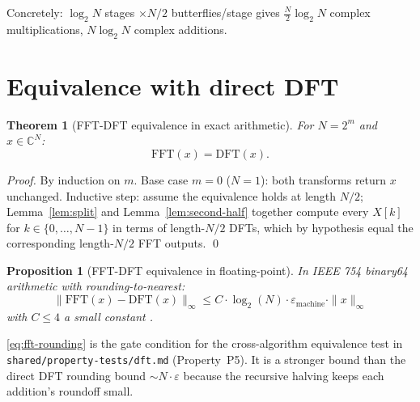 \documentclass[11pt,a4paper]{article}
\theoremstyle{plain}
\newtheorem{theorem}{Theorem}
\newtheorem{proposition}{Proposition}
\begin{document}
Concretely: $\log_2 N$ stages $\times N/2$ butterflies/stage gives
$\frac{N}{2}\log_2 N$ complex multiplications, $N \log_2 N$ complex additions.

\section{Equivalence with direct DFT}

\begin{theorem}[FFT-DFT equivalence in exact arithmetic]
\label{thm:fft-dft-exact}
For $N = 2^m$ and $x \in \mathbb{C}^N$:
\begin{equation}
\mathrm{FFT}(x) = \mathrm{DFT}(x).
\end{equation}
\end{theorem}

\begin{proof}
By induction on $m$. Base case $m = 0$ ($N = 1$): both transforms return $x$
unchanged. Inductive step: assume the equivalence holds at length $N/2$;
Lemma~\ref{lem:split} and Lemma~\ref{lem:second-half} together compute every
$X[k]$ for $k \in \{0, \ldots, N-1\}$ in terms of length-$N/2$ DFTs, which
by hypothesis equal the corresponding length-$N/2$ FFT outputs. \qed
\end{proof}

\begin{proposition}[FFT-DFT equivalence in floating-point]
\label{prop:fft-dft-fp}
In IEEE 754 binary64 arithmetic with rounding-to-nearest:
\begin{equation}
\label{eq:fft-rounding}
\big\| \mathrm{FFT}(x) - \mathrm{DFT}(x) \big\|_\infty
\leq C \cdot \log_2(N) \cdot \varepsilon_{\mathrm{machine}} \cdot \|x\|_\infty
\end{equation}
with $C \leq 4$ a small constant \cite[§12.2]{NumRec3rd}.
\end{proposition}

\eqref{eq:fft-rounding} is the gate condition for the cross-algorithm equivalence
test in \texttt{shared/property-tests/dft.md} (Property~P5). It is a stronger bound
than the direct DFT rounding bound $\sim N \cdot \varepsilon$ because the recursive
halving keeps each addition's roundoff small.

\printbibliography
\end{document}
